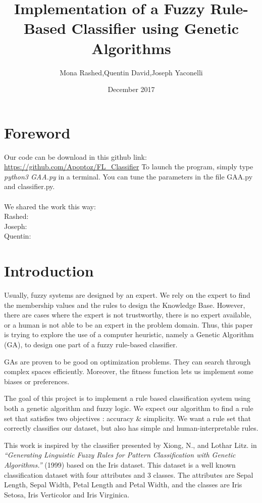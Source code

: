 \documentclass[a4paper,12pt]{article}
\begin{document}
\title{Implementation of a Fuzzy Rule-Based Classifier using Genetic Algorithms}
\author{Mona Rashed,Quentin David,Joseph Yaconelli}
\date{December 2017}
\maketitle


\section{Foreword}

Our code can be download in this github link:
\url{https://github.com/Apoptoz/FL_Classifier}
To launch the program, simply type \textit{python3 GAA.py} in a terminal.
You can tune the parameters in the file GAA.py and classifier.py.\\
\\
We shared the work this way:\\
Rashed: \\
Joseph: \\
Quentin: \\

\section{Introduction}

Usually, fuzzy systems are designed by an expert. We rely on the expert to find the membership values and the rules to design the Knowledge Base.
However, there are cases where the expert is not trustworthy, there is no expert available, or a human is not able to be an expert in the problem domain. Thus, this paper is trying to explore the use of a computer heuristic, namely a Genetic Algorithm (GA), to design one part of a fuzzy rule-based classifier.

GAs are proven to be good on optimization problems. They can search through complex spaces efficiently. Moreover, the fitness function lets us implement some biases or preferences.

The goal of this project is to implement a rule based classification system using both a genetic algorithm and fuzzy logic.
We expect our algorithm to find a rule set that satisfies two objectives : accuracy \& simplicity.
We want a rule set that correctly classifies our dataset, but also has simple and human-interpretable rules.

This work is inspired by the classifier presented by Xiong, N., and Lothar Litz. in \textit{“Generating Linguistic Fuzzy Rules for Pattern Classification with Genetic Algorithms.”} (1999) based on the Iris dataset. This dataset is a well known classification dataset with four attributes and 3 classes. The attributes are Sepal Length, Sepal Width, Petal Length and Petal Width, and the classes are Iris Setosa, Iris Verticolor and Iris Virginica. \\
\end{document}
